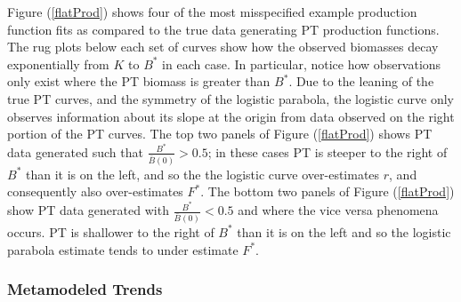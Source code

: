 %
Figure (\ref{flatProd}) shows four of the most misspecified example
production function fits as compared to the true data generating PT production
functions. The rug plots below each set of curves show how the observed
biomasses decay exponentially from $K$ to $B^*$ in each case. In particular,
notice how observations only exist where the PT biomass is greater than $B^*$.
Due to the leaning of the true PT curves, and the symmetry of the logistic
parabola, the logistic curve only observes information about its slope at the
origin from data observed on the right portion of the PT curves. The top two
panels of Figure (\ref{flatProd}) shows PT data generated such
that $\frac{B^*}{\bar B(0)}>0.5$; in these cases PT is steeper to the right of
$B^*$ than it is on the left, and so the the logistic curve over-estimates $r$,
and consequently also over-estimates $F^*$. %
The bottom two panels of Figure (\ref{flatProd}) show PT data
generated with $\frac{B^*}{\bar B(0)}<0.5$ and where the vice versa phenomena
occurs. PT is shallower to the right of $B^*$ than it is on the left and so the
logistic parabola estimate tends to under estimate $F^*$.

%
\subsubsection{Metamodeled Trends}



